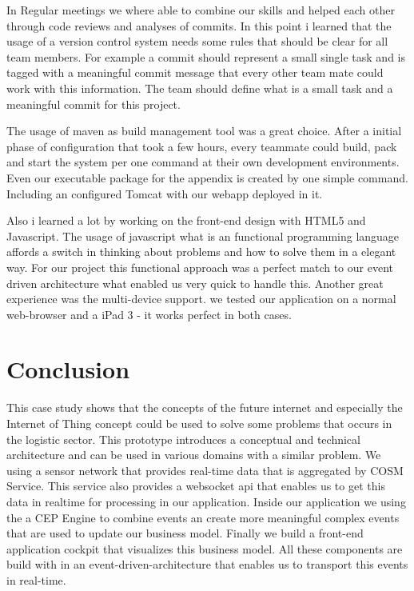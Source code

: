 \documentclass{acm_proc_article-sp}
\begin{document}
In Regular meetings we where able to combine our skills and helped each other through code reviews and analyses of commits. In this point i learned that the usage of a version control system needs some rules that should be clear for all team members. For example a commit should represent a small single task and is tagged with a meaningful commit message that every other team mate could work with this information. The team should define what is a small task and a meaningful commit for this project.

The usage of maven as build management tool was a great choice. After a initial phase of configuration that took a few hours, every teammate could build, pack and start the system per one command at their own development environments. Even our executable package for the appendix is created by one simple command. Including an configured Tomcat with our webapp deployed in it.

Also i learned a lot by working on the front-end design with HTML5 and Javascript.
The usage of javascript what is an functional programming language affords a switch in thinking about problems and how to solve them in a elegant way.
For our project this functional approach was a perfect match to our event driven architecture what enabled us very quick to handle this.
Another great experience was the multi-device support. we tested our application on a normal web-browser and a iPad 3 - it works perfect in both cases.

\section{Conclusion}
\label{sec:Conclusion}
This case study shows that the concepts of the future internet and especially the Internet of Thing concept could be used to solve some problems that occurs in the logistic sector.
This prototype introduces a conceptual and technical architecture and can be used in various domains with a similar problem. 
We using a sensor network that provides real-time data that is aggregated by COSM Service. This service also provides a websocket api that enables us to get this data in realtime for processing in our application. Inside our application we using the a CEP Engine to combine events an create more meaningful complex events that are used to update our business model. Finally we build a front-end application cockpit that visualizes  this business model.
All these components are build with in an event-driven-architecture that enables us to transport this events in real-time.
\end{document}
